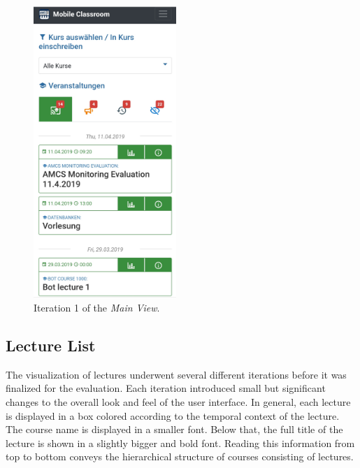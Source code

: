 \begin{figure}
	\vspace*{-2cm}
	\begin{center}
		\includegraphics[width=0.48\textwidth]{screenshots/redesign/main_view_iteration_1.jpg}
	\end{center}
	\captionsetup{format=plain}
	\caption{Iteration 1 of the \emph{Main View}.}
	\label{fig:main_view:_it1}
	\vspace*{-1.5cm}
\end{figure}

\subsection{Lecture List}
The visualization of lectures underwent several different iterations before it was finalized for the evaluation. Each iteration introduced small but significant changes to the overall look and feel of the user interface.
In general, each lecture is displayed in a box colored according to the temporal context of the lecture.
The course name is displayed in a smaller font. Below that, the full title of the lecture is shown in a slightly bigger and bold font. Reading this information from top to bottom conveys the hierarchical structure of courses consisting of lectures. 

